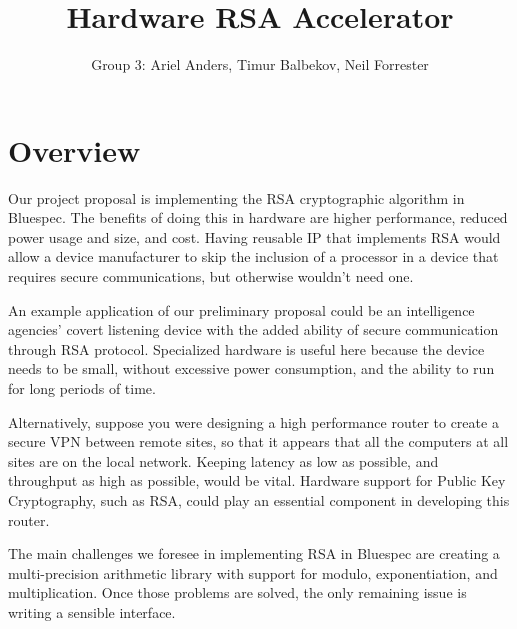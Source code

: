 \documentclass[12pt]{article}
\title{Hardware RSA Accelerator}
\author{Group 3: Ariel Anders, Timur Balbekov, Neil Forrester}
\begin{document}
\maketitle

\section{Overview}
Our project proposal is implementing the RSA cryptographic algorithm in Bluespec.
The benefits of doing this in hardware are higher performance, reduced power usage and size, and cost.
Having reusable IP that implements RSA would allow a device manufacturer to skip the inclusion
of a processor in a device that requires secure communications, but otherwise wouldn't need one. 

An example application of our preliminary proposal could be an intelligence agencies' covert listening device
with the added ability of secure communication through RSA protocol.
Specialized hardware is useful here because the device needs to be small,
without excessive power consumption, and the ability to run for long periods of time. 

Alternatively, suppose you were designing a high performance router to create a secure VPN between remote sites,
so that it appears that all the computers at all sites are on the local network.
Keeping latency as low as possible, and throughput as high as possible, would be vital.
Hardware support for Public Key Cryptography, such as RSA,
could play an essential component in developing this router.

The main challenges we foresee in implementing RSA in Bluespec are creating a multi-precision arithmetic library
with support for modulo, exponentiation, and multiplication.
Once those problems are solved, the only remaining issue is writing a sensible interface.
\end{document}
